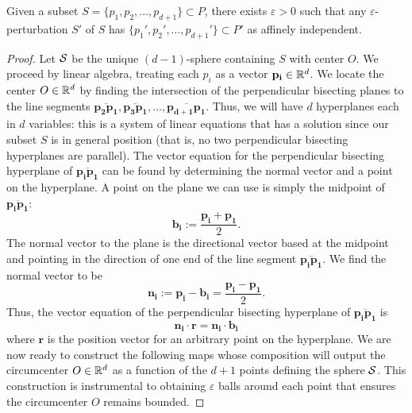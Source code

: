 \documentclass[letterpaper,titlepage]{article}
\begin{document}
    \begin{lem}\label{affine_indep_lemma}
        Given a subset $S= \{p_1,p_2,\dots,p_{d+1}\} \subset P$, there exists $\varepsilon>0$ such that any $\varepsilon$-perturbation $S'$ of $S$ has $\{p_1',p_2',\dots,p_{d+1}'\} \subset P'$ as affinely independent.
    \end{lem}
    \begin{proof}
        Let $\mathcal{S}$ be the unique $(d-1)$-sphere containing $S$ with center $O$. We proceed by linear algebra, treating each $p_i$ as a vector $\mathbf{p_i} \in \mathbb{R}^d$. We locate the center $O \in \mathbb{R}^d$ by finding the intersection of the perpendicular bisecting planes to the line segments $\overline{\mathbf{p_2}\mathbf{p_1}}, \overline{\mathbf{p_3}\mathbf{p_1}}, \dots, \overline{\mathbf{p_{d+1}}\mathbf{p_1}}$.
        Thus, we will have $d$ hyperplanes each in $d$ variables: this is a system of linear equations that has a solution since our subset $S$ is in general position (that is, no two perpendicular bisecting hyperplanes are parallel). The vector equation for the perpendicular bisecting hyperplane of $\overline{\mathbf{p_i}\mathbf{p_1}}$ can be found by determining the normal vector and a point on the hyperplane. A point on the plane we can use is simply the midpoint of $\overline{\mathbf{p_i}\mathbf{p_1}}$:
        $$\mathbf{b_i} := \frac{\mathbf{p_i}+\mathbf{p_1}}{2}.$$
        The normal vector to the plane is the directional vector based at the midpoint and pointing in the direction of one end of the line segment $\overline{\mathbf{p_i}\mathbf{p_1}}$. We find the normal vector to be
        $$\mathbf{n_i} := \mathbf{p_i}-\mathbf{b_i} = \frac{\mathbf{p_i}-\mathbf{p_1}}{2}.$$
        Thus, the vector equation of the perpendicular bisecting hyperplane of $\overline{\mathbf{p_i}\mathbf{p_1}}$ is
        $$\mathbf{n_i}\cdot \mathbf{r}=\mathbf{n_i}\cdot\mathbf{b_i}$$
        where $\mathbf{r}$ is the position vector for an arbitrary point on the hyperplane.
        \newline
        We are now ready to construct the following maps whose composition will output the circumcenter $O \in \mathbb{R}^d$ as a function of the $d+1$ points defining the sphere $\mathcal{S}$. This construction is instrumental to obtaining $\varepsilon$ balls around each point that ensures the circumcenter $O$ remains bounded.


\end{proof}
\end{document}
